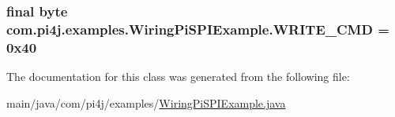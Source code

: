\subsubsection[{W\+R\+I\+T\+E\+\_\+\+C\+M\+D}]{\setlength{\rightskip}{0pt plus 5cm}final byte com.\+pi4j.\+examples.\+Wiring\+Pi\+S\+P\+I\+Example.\+W\+R\+I\+T\+E\+\_\+\+C\+M\+D = 0x40\hspace{0.3cm}{\ttfamily [static]}}\label{classcom_1_1pi4j_1_1examples_1_1WiringPiSPIExample_a8589056f095327e06bc67ab04f2d4be2}


The documentation for this class was generated from the following file\+:\begin{DoxyCompactItemize}
\item 
main/java/com/pi4j/examples/\hyperlink{WiringPiSPIExample_8java}{Wiring\+Pi\+S\+P\+I\+Example.\+java}\end{DoxyCompactItemize}
